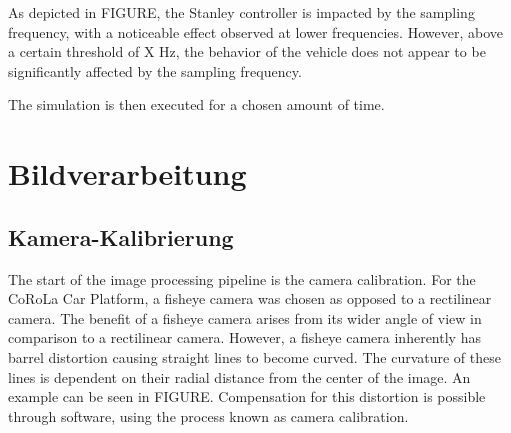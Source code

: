 \documentclass[arbeit=studie,oneside,BCOR=12mm]{ArbeitRST}
\begin{document}
As depicted in FIGURE, the Stanley controller is impacted by the sampling
frequency, with a noticeable effect observed at lower frequencies. However,
above a certain threshold of X Hz, the behavior of the vehicle does not appear
to be significantly affected by the sampling frequency.

The simulation is then executed for a chosen amount of time. 

\chapter{Bildverarbeitung} 

\section{Kamera-Kalibrierung} 

The start of the image processing pipeline is the camera calibration. For the
CoRoLa Car Platform, a fisheye camera was chosen as opposed to a rectilinear
camera. The benefit of a fisheye camera arises from its wider angle of view in
comparison to a rectilinear camera. However, a fisheye camera inherently has
barrel distortion causing straight lines to become curved. The curvature of
these lines is dependent on their radial distance from the center of
the image. An example can be seen in FIGURE. Compensation for this distortion
is possible through software, using the process known as camera calibration. 
\end{document}
